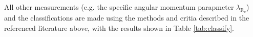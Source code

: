 \documentclass[fleqn,usenatbib,useAMS]{mnras}
\begin{document}





	All other measurements (e.g. the specific angular momentum parapmeter $\lambda_\mathrm{R_e}$) and the classifications are made using the methods and critia described in the referenced literature above, with the results shown in Table \ref{tab:classify}.
\end{document}
